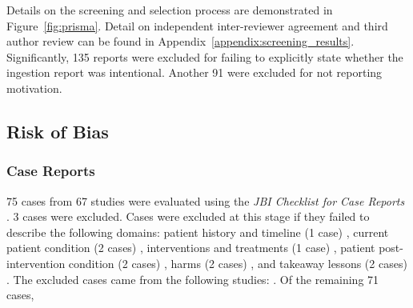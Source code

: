 \documentclass[pdflatex,sn-basic,Numbered]{sn-jnl}
\begin{document}
\noindent Details on the screening and selection process are demonstrated in Figure~\ref{fig:prisma}. Detail on independent inter-reviewer agreement and third author review can be found in Appendix~\ref{appendix:screening_results}. Significantly, 135 reports were excluded for failing to explicitly state whether the ingestion report was intentional. Another 91 were excluded for not reporting motivation. 

\subsection{Risk of Bias}
\subsubsection*{Case Reports} 
75 cases from 67 studies \cite{Akay_2015f, Al-Faham_2020k, AlShaaibi_2021b, Alao_2006i, Ali_2017, Ali_2020f, Ali_2022g, Apikotoa_2022f, Ataya_2013, Atayan_2016, Beecroft_1998, Benoist_2019e, Berry_2021e, Bhasin_2014, Bhattacharjee_2008, Bhumi_2024f, CamachoDorado_2018, Cauchi_2002, Chang_2017f, Cox_2007, Csaky_1998e, DelgadoSalazar_2020c, DivsalarP._2023a, Emamhadi_2018, Farhadi_2024h, Fry_2010, Gardner_2017h, Goldman_1998f, Guinan_2019f, Hardy_2023g, Jehangir_2019h, Jin_2023, Kar_2015, Kariholu_2008, Kerestes_2019, Kobiela_2015, Kumar_2001, Kumar_2019f, Lee_2012l, Li_2013, Liu_2005, Losanoff_1996, Losanoff_1997e, Mesfin_2022a, Misra_2013, Naji_2012f, Ohno_2005, Peixoto_2017f, Qureshi_2016, Riva_2018j, Sakellaridis_2008f, Sharma_2022e, Sobnach_2011f, Sultan_2024f, Tammana_2012j, Tanrikulu_2015e, Tay_2004, Thapa_2019f, Trgo_2012f, Tupesis_2004f, Wadhwa_2015e, Wildhaber_2005, Wnęk_2015f, Yasin_2009, Yildiz_2016e, fjbuilsRepeatedBehaviorDeliberate2024, teWildt_2010} were evaluated using the \textit{{JBI Checklist for Case Reports}} \cite{Moola_2020}.
3 cases were excluded.
Cases were excluded at this stage if they failed to describe the following domains: patient history and timeline (1 case) \cite{Lee_2012l}, current patient condition (2 cases) \cite{Lee_2012l}, interventions and treatments (1 case) \cite{Sharma_2022e}, patient post-intervention condition (2 cases) \cite{Lee_2012l}, harms (2 cases) \cite{Lee_2012l}, and takeaway lessons (2 cases) \cite{Lee_2012l}. The excluded cases came from the following studies: \cite{Lee_2012l, Sharma_2022e}.
Of the remaining 71 cases, 
\end{document}
